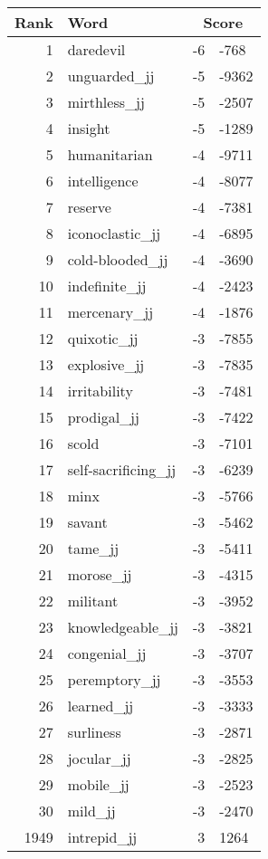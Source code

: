 \begin{longtable}[!htbp]{| rlr@{.}l |}
    \hline
    \textbf{Rank} & \textbf{Word} & \multicolumn{2}{c|}{\textbf{Score}} \\
    \hline
    \endhead
    1 & daredevil & -6 & -768 \\
    2 & unguarded\_jj & -5 & -9362 \\
    3 & mirthless\_jj & -5 & -2507 \\
    4 & insight & -5 & -1289 \\
    5 & humanitarian & -4 & -9711 \\
    6 & intelligence & -4 & -8077 \\
    7 & reserve & -4 & -7381 \\
    8 & iconoclastic\_jj & -4 & -6895 \\
    9 & cold-blooded\_jj & -4 & -3690 \\
    10 & indefinite\_jj & -4 & -2423 \\
    11 & mercenary\_jj & -4 & -1876 \\
    12 & quixotic\_jj & -3 & -7855 \\
    13 & explosive\_jj & -3 & -7835 \\
    14 & irritability & -3 & -7481 \\
    15 & prodigal\_jj & -3 & -7422 \\
    16 & scold & -3 & -7101 \\
    17 & self-sacrificing\_jj & -3 & -6239 \\
    18 & minx & -3 & -5766 \\
    19 & savant & -3 & -5462 \\
    20 & tame\_jj & -3 & -5411 \\
    21 & morose\_jj & -3 & -4315 \\
    22 & militant & -3 & -3952 \\
    23 & knowledgeable\_jj & -3 & -3821 \\
    24 & congenial\_jj & -3 & -3707 \\
    25 & peremptory\_jj & -3 & -3553 \\
    26 & learned\_jj & -3 & -3333 \\
    27 & surliness & -3 & -2871 \\
    28 & jocular\_jj & -3 & -2825 \\
    29 & mobile\_jj & -3 & -2523 \\
    30 & mild\_jj & -3 & -2470 \\
    1949 & intrepid\_jj & 3 & 1264 \\

\end{longtable}
